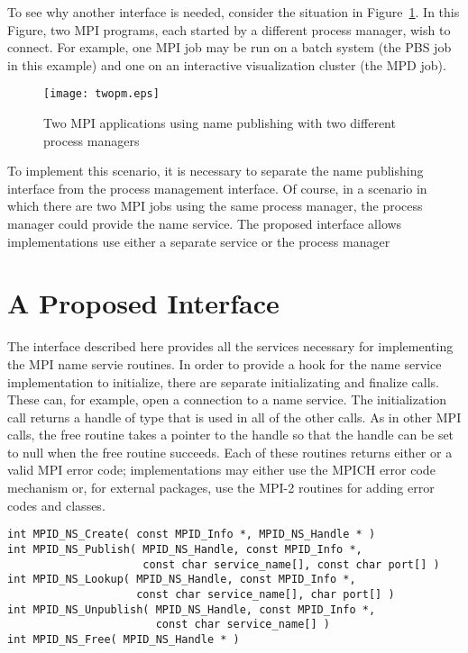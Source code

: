 \documentclass{article}
\begin{document}
To see why another interface is needed, consider the situation in
Figure~\ref{fig:multiple-pm}.  In this Figure, two MPI programs, each
started by a different process manager, wish to connect.  For example,
one MPI job may be run on a batch system (the PBS job in this example)
and one on an interactive visualization cluster (the MPD job).  

\begin{figure}
\centerline{\texttt{[image: twopm.eps]}}
\caption{Two MPI applications using name publishing with two different
process managers}\label{fig:multiple-pm}
\end{figure}

To implement this scenario, it is necessary to separate the name
publishing interface from the process management interface.  
Of course, in a scenario in which there are two MPI jobs using the
same process manager, the process manager could provide the name
service.  The proposed interface allows implementations use either a
separate service or the process manager

\section{A Proposed Interface}
\label{sec:name-interface}

The interface described here provides all the services necessary for
implementing the MPI name servie routines.  In order to provide a hook
for the name service implementation to initialize, there are separate
initializating and finalize calls.  These can, for example, open a
connection to a name service.  The initialization call returns a
handle of type  that is used in all of the other
calls.  As in other MPI calls, the free routine takes a pointer to the
handle so that the handle can be set to null when the free routine
succeeds.  Each of these routines returns either  or
a valid MPI error code; implementations may either use the MPICH
error code mechanism or, for external packages, use the MPI-2 routines
for adding error codes and classes.

\begin{verbatim}
int MPID_NS_Create( const MPID_Info *, MPID_NS_Handle * )
int MPID_NS_Publish( MPID_NS_Handle, const MPID_Info *, 
                     const char service_name[], const char port[] )
int MPID_NS_Lookup( MPID_NS_Handle, const MPID_Info *,
                    const char service_name[], char port[] )
int MPID_NS_Unpublish( MPID_NS_Handle, const MPID_Info *, 
                       const char service_name[] )
int MPID_NS_Free( MPID_NS_Handle * )
\end{verbatim}
\end{document}
